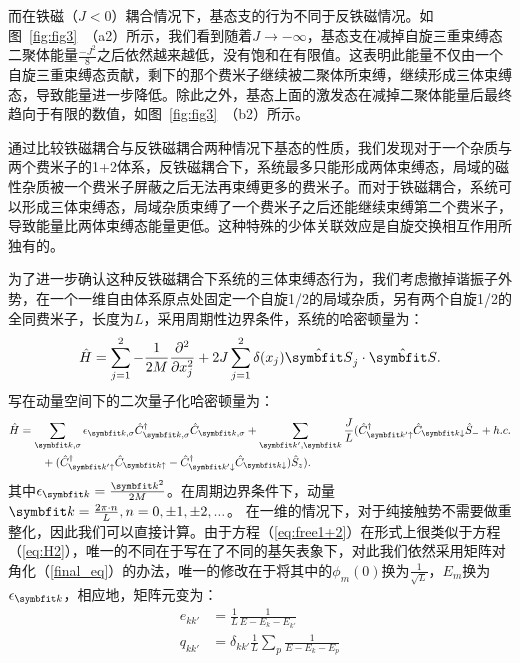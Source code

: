 而在铁磁（$J<0$）耦合情况下，基态支的行为不同于反铁磁情况。如图~\ref{fig:fig3}~（a2）所示，我们看到随着$J\to-\infty$，基态支在减掉自旋三重束缚态二聚体能量$\frac{-J^2}{8}$之后依然越来越低，没有饱和在有限值。这表明此能量不仅由一个自旋三重束缚态贡献，剩下的那个费米子继续被二聚体所束缚，继续形成三体束缚态，导致能量进一步降低。除此之外，基态上面的激发态在减掉二聚体能量后最终趋向于有限的数值，如图~\ref{fig:fig3}~（b2）所示。

通过比较铁磁耦合与反铁磁耦合两种情况下基态的性质，我们发现对于一个杂质与两个费米子的1+2体系，反铁磁耦合下，系统最多只能形成两体束缚态，局域的磁性杂质被一个费米子屏蔽之后无法再束缚更多的费米子。而对于铁磁耦合，系统可以形成三体束缚态，局域杂质束缚了一个费米子之后还能继续束缚第二个费米子，导致能量比两体束缚态能量更低。这种特殊的少体关联效应是自旋交换相互作用所独有的。

为了进一步确认这种反铁磁耦合下系统的三体束缚态行为，我们考虑撤掉谐振子外势，在一个一维自由体系原点处固定一个自旋1/2的局域杂质，另有两个自旋1/2的全同费米子，长度为$L$，采用周期性边界条件，系统的哈密顿量为：
\begin{equation}
        \hat{H} = \sum_{j=1}^{2}  -\frac{1}{2M} \frac{\partial^2}{\partial x_{j}^2} + 2J\sum_{j=1}^2\delta(x_j){\hat{\Vector{S}}}_j\cdot {\hat{\Vector{S}}}.
\end{equation}
写在动量空间下的二次量子化哈密顿量为：
\begin{equation}\label{eq:free1+2}
\begin{split}
        \hat{H} &= \sum_{\Vector{k},\sigma}\epsilon_{\Vector{k},\sigma} \hat{C}^\dagger_{\Vector{k},\sigma} \hat{C}_{\Vector{k},\sigma}  + \sum_{\Vector{k}',\Vector{k}} \frac{J}{L} ( \hat{C}_{\Vector{k}'\uparrow}^\dagger  \hat{C}_{\Vector{k}\downarrow} \hat{S}_- + h.c. \\
        & \quad \quad +   (\hat{C}_{\Vector{k}'\uparrow}^\dagger  \hat{C}_{\Vector{k}\uparrow}-\hat{C}_{\Vector{k}'\downarrow}^\dagger  \hat{C}_{\Vector{k}\downarrow}) \hat{S}_{z} ).
\end{split}
\end{equation}
其中$\epsilon_{\Vector{k}} = \frac{\Vector{k}^2}{2M}$。在周期边界条件下，动量$\Vector{k} = \frac{2\pi\cdot n}{L}, n=0, \pm1, \pm2,...$。
在一维的情况下，对于纯接触势不需要做重整化，因此我们可以直接计算。由于方程（\ref{eq:free1+2}）在形式上很类似于方程（\ref{eq:H2}），唯一的不同在于写在了不同的基矢表象下，对此我们依然采用矩阵对角化（\ref{final_eq}）的办法，唯一的修改在于将其中的$\phi_m(0)$换为$\frac{1}{\sqrt{L}}$，$E_m$换为$\epsilon_{\Vector{k}}$，相应地，矩阵元变为：
\begin{equation}
\begin{split}
e_{kk'} &= \frac{1}{L}\frac{1}{E-E_k-E_{k'}}\\
q_{kk'} &= \delta_{kk'}  \frac{1}{L}\sum_p \frac{1}{E-E_k-E_p}\\
\end{split}
\end{equation}

